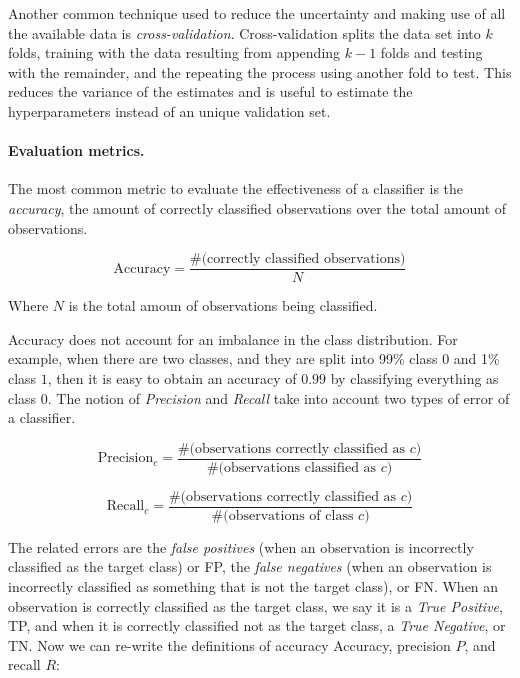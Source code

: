 
Another common technique used to reduce the uncertainty and making use of all
the available data is {\em cross-validation}.
%
Cross-validation splits the data set into $k$ folds, training with the data
resulting from appending $k-1$ folds and testing with the remainder, and the
repeating the process using another fold to test.
%
This reduces the variance of the estimates and is useful to estimate the
hyperparameters instead of an unique validation set.


\paragraph{Evaluation metrics.} 
%
The most common metric to evaluate the effectiveness of a classifier is the {\em
accuracy}, the amount of correctly classified observations over the total amount of
observations.

\begin{equation}
    \text{Accuracy} = \frac{\text{\#(correctly\ classified\ observations)}}{N}
\end{equation}

Where $N$ is the total amoun of observations being classified.

Accuracy does not account for an imbalance in the class distribution.
%
For example, when there are two classes, and they are split into 99\% class $0$
and 1\% class $1$, then it is easy to obtain an accuracy of $0.99$ by
classifying everything as class $0$.
%
The notion of {\em Precision} and {\em Recall} take into account two types of
error of a classifier.

\begin{equation}
    \text{Precision}_c = \frac{\text{\#(observations\ correctly\ classified\ as\ } c \text{)}}{ \text{\#(observations\ classified\ as\ } c \text{)} }
\end{equation}

\begin{equation}
    \text{Recall}_c = \frac{\text{\#(observations\ correctly\ classified\ as\ } c \text{)}}{ \text{\#(observations\ of\ class\ } c\text{)} } 
\end{equation}

The related errors are the {\em false positives} (when an observation is
incorrectly classified as the target class) or FP, the {\em false negatives}
(when an observation is incorrectly classified as something that is not the
target class), or FN. 
%
When an observation is correctly classified as the target class, we say it is a
{\em True Positive}, TP, and when it is correctly classified not as the target
class, a {\em True Negative}, or TN.
%
Now we can re-write the definitions of accuracy Accuracy, precision $P$, and recall
$R$:

